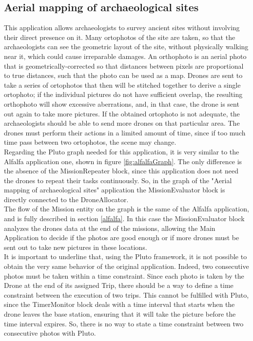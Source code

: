 \subsection{Aerial mapping of archaeological sites}\label{aerialMapping}

This application allows archaeologists to survey ancient sites without involving their direct presence on it.
Many ortophotos of the site are taken, so that the archaeologists can see the geometric layout of the site, without physically walking near it, which could cause irreparable damages.
An orthophoto is an aerial photo that is geometrically-corrected so that distances between pixels are proportional to true distances, such that the photo can be used as a map.
Drones are sent to take a series of ortophotos that then will be stitched together to derive a single ortophoto; if the individual pictures do not have sufficient overlap, the resulting orthophoto will show excessive aberrations, and, in that case, the drone is sent out again to take more pictures.
If the obtained ortophoto is not adequate, the archaeologists should be able to send more drones on that particular area.
The drones must perform their actions in a limited amount of time, since if too much time pass between two ortophotos, the scene may change.
\\

Regarding the Pluto graph needed for this application, it is very similar to the Alfalfa\cite{alfalfa} application one, shown in figure \ref{fig:alfalfaGraph}.
The only difference is the absence of the MissionRepeater block, since this application does not need the drones to repeat their tasks continuously.
So, in the graph of the "Aerial mapping of archaeological sites" application the MissionEvaluator block is directly connected to the DroneAllocator.
\\

The flow of the Mission entity on the graph is the same of the Alfalfa\cite{alfalfa} application, and is fully described in section \ref{alfalfa}.
In this case the MissionEvaluator block analyzes the drones data at the end of the missions, allowing the Main Application to decide if the photos are good enough or if more drones must be sent out to take new pictures in these locations.
\\

It is important to underline that, using the Pluto framework, it is not possible to obtain the very same behavior of the original application.
Indeed, two consecutive photos must be taken within a time constraint.
Since each photo is taken by the Drone at the end of its assigned Trip, there should be a way to define a time constraint between the execution of two trips.
This cannot be fulfilled with Pluto, since the TimerMonitor block deals with a time interval that starts when the drone leaves the base station, ensuring that it will take the picture before the time interval expires.
So, there is no way to state a time constraint between two consecutive photos with Pluto.
\\

